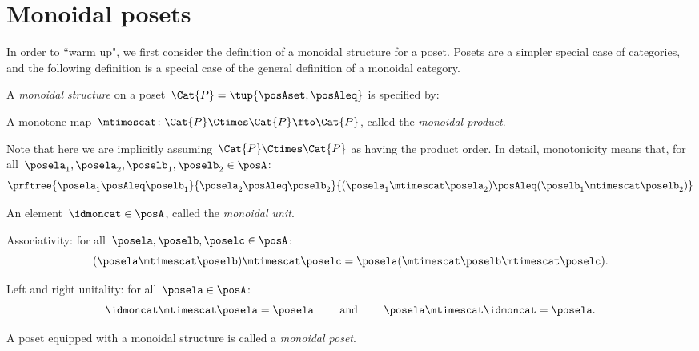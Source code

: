 

\section{Monoidal posets}




In order to ``warm up", we first consider the definition of a monoidal structure for a poset.
Posets are a simpler special case of categories, and the following definition is a special case of the general definition of a monoidal category.

\begin{ctdefinition}
    \label{def:monoidal-poset}
    A \emph{monoidal structure} on a poset~$\Cat{P} = \tup{\posAset, \posAleq}$ is specified by:
    
    \constit
    \begin{compactenum}
        \item A monotone map~$\mtimescat \colon \Cat{P} \Ctimes \Cat{P} \fto \Cat{P}$, called the \emph{monoidal product}.
        
        \noindent
        Note that here we are implicitly assuming~$\Cat{P} \Ctimes \Cat{P}$ as having the product order.
        In detail, monotonicity means that, for all~$\posela_1, \posela_2, \poselb_1, \poselb_2 \in \posA$:
        \begin{equation}
            \prftree
            {\posela_1 \posAleq \poselb_1}{\posela_2 \posAleq \poselb_2}{ (\posela_1 \mtimescat  \posela_2) \posAleq  (\poselb_1 \mtimescat  \poselb_2)}
        \end{equation}
        \item An element~$\idmoncat \in \posA$, called the \emph{monoidal unit}.
    \end{compactenum}
    
    \condit
    \begin{compactenum}
        \item Associativity: for all~$\posela, \poselb, \poselc \in \posA$:
        \begin{equation}
        (\posela \mtimescat \poselb)
            \mtimescat \poselc =  \posela ( \mtimescat \poselb \mtimescat \poselc).
        \end{equation}
        \item Left and right unitality: for all~$\posela \in \posA$:
        \begin{equation}
            \idmoncat \mtimescat \posela = \posela \quad \quad \text{ and } \quad \quad \posela \mtimescat \idmoncat = \posela.
        \end{equation}
    \end{compactenum}
    
    \noindent A poset equipped with a monoidal structure is called a \emph{monoidal poset}.
\end{ctdefinition}

